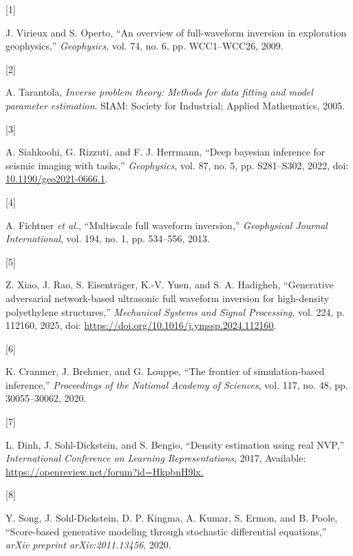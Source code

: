 \documentclass[
]{article}
\newlength{\cslhangindent}
\newlength{\csllabelwidth}
\newenvironment{CSLReferences}[2] %
 {\begin{list}{}{%
  \setlength{\itemindent}{0pt}
  \setlength{\leftmargin}{0pt}
  \setlength{\parsep}{0pt}
  \ifodd #1
   \setlength{\leftmargin}{\cslhangindent}
   \setlength{\itemindent}{-1\cslhangindent}
  \fi
  \setlength{\itemsep}{#2\baselineskip}}}
 {\end{list}}
\newcommand{\CSLLeftMargin}[1]{\parbox[t]{\csllabelwidth}{\strut#1\strut}}
\newcommand{\CSLRightInline}[1]{\parbox[t]{\linewidth - \csllabelwidth}{\strut#1\strut}}
\begin{document}
\label{refs}
\begin{CSLReferences}{0}{0}
\CSLLeftMargin{{[}1{]} }%
\CSLRightInline{J. Virieux and S. Operto, {``An overview of
full-waveform inversion in exploration geophysics,''} \emph{Geophysics},
vol. 74, no. 6, pp. WCC1--WCC26, 2009.}

\CSLLeftMargin{{[}2{]} }%
\CSLRightInline{A. Tarantola, \emph{Inverse problem theory: Methods for
data fitting and model parameter estimation}. SIAM: Society for
Industrial; Applied Mathematics, 2005.}

\CSLLeftMargin{{[}3{]} }%
\CSLRightInline{A. Siahkoohi, G. Rizzuti, and F. J. Herrmann, {``Deep
bayesian inference for seismic imaging with tasks,''} \emph{Geophysics},
vol. 87, no. 5, pp. S281--S302, 2022, doi:
\href{https://doi.org/10.1190/geo2021-0666.1}{10.1190/geo2021-0666.1}.}

\CSLLeftMargin{{[}4{]} }%
\CSLRightInline{A. Fichtner \emph{et al.}, {``Multiscale full waveform
inversion,''} \emph{Geophysical Journal International}, vol. 194, no. 1,
pp. 534--556, 2013.}

\CSLLeftMargin{{[}5{]} }%
\CSLRightInline{Z. Xiao, J. Rao, S. Eisenträger, K.-V. Yuen, and S. A.
Hadigheh, {``Generative adversarial network-based ultrasonic full
waveform inversion for high-density polyethylene structures,''}
\emph{Mechanical Systems and Signal Processing}, vol. 224, p. 112160,
2025, doi: \url{https://doi.org/10.1016/j.ymssp.2024.112160}.}

\CSLLeftMargin{{[}6{]} }%
\CSLRightInline{K. Cranmer, J. Brehmer, and G. Louppe, {``The frontier
of simulation-based inference,''} \emph{Proceedings of the National
Academy of Sciences}, vol. 117, no. 48, pp. 30055--30062, 2020.}

\CSLLeftMargin{{[}7{]} }%
\CSLRightInline{L. Dinh, J. Sohl-Dickstein, and S. Bengio, {``Density
estimation using real NVP,''} \emph{International Conference on Learning
Representations}, 2017, Available:
\url{https://openreview.net/forum?id=HkpbnH9lx.}}

\CSLLeftMargin{{[}8{]} }%
\CSLRightInline{Y. Song, J. Sohl-Dickstein, D. P. Kingma, A. Kumar, S.
Ermon, and B. Poole, {``Score-based generative modeling through
stochastic differential equations,''} \emph{arXiv preprint
arXiv:2011.13456}, 2020.}


\end{CSLReferences}
\end{document}
